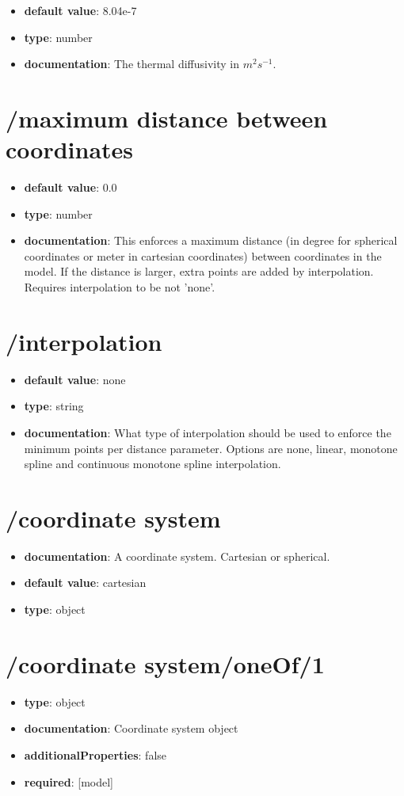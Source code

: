 \begin{itemize}\item {\bf default value}: 8.04e-7
\item {\bf type}: number
\item {\bf documentation}: The thermal diffusivity in $m^{2} s^{-1}$.
\end{itemize}\section{/maximum distance between coordinates}
\begin{itemize}\item {\bf default value}: 0.0
\item {\bf type}: number
\item {\bf documentation}: This enforces a maximum distance (in degree for spherical coordinates or meter in cartesian coordinates) between coordinates in the model. If the distance is larger, extra points are added by interpolation. Requires interpolation to be not 'none'.
\end{itemize}\section{/interpolation}
\begin{itemize}\item {\bf default value}: none
\item {\bf type}: string
\item {\bf documentation}: What type of interpolation should be used to enforce the minimum points per distance parameter. Options are none, linear, monotone spline and continuous monotone spline interpolation.
\end{itemize}\section{/coordinate system}
\begin{itemize}\item {\bf documentation}: A coordinate system. Cartesian or spherical.
\item {\bf default value}: cartesian
\item {\bf type}: object
\end{itemize}
\section{/coordinate system/oneOf/1}
\begin{itemize}\item {\bf type}: object
\item {\bf documentation}: Coordinate system object
\item {\bf additionalProperties}: false
\item {\bf required}: [model]\end{itemize}
